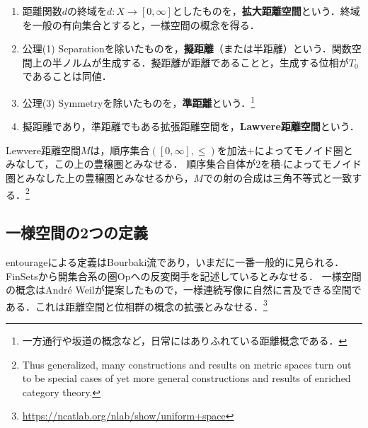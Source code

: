 \documentclass[uplatex,dvipdfmx]{jsreport}
\begin{document}
\begin{definition}\mbox{}
    \begin{enumerate}
        \item 距離関数$d$の終域を$d:X\to[0,\infty]$としたものを，\textbf{拡大距離空間}という．終域を一般の有向集合とすると，一様空間の概念を得る．
        \item 公理(1) Separationを除いたものを，\textbf{擬距離}（または半距離）という．関数空間上の半ノルムが生成する．擬距離が距離であることと，生成する位相が$T_0$であることは同値．
        \item 公理(3) Symmetryを除いたものを，\textbf{準距離}という．\footnote{一方通行や坂道の概念など，日常にはありふれている距離概念である．}
        \item 擬距離であり，準距離でもある拡張距離空間を，\textbf{Lawvere距離空間}という．
    \end{enumerate}
\end{definition}

\begin{lemma}
    Lewvere距離空間$M$は，順序集合$([0,\infty],\le)$を加法$+$によってモノイド圏とみなして，この上の豊穣圏とみなせる．
    順序集合自体が$2$を積$\cdot$によってモノイド圏とみなした上の豊穣圏とみなせるから，$M$での射の合成は三角不等式と一致する．\footnote{Thus generalized, many constructions and results on metric spaces turn out to be special cases of yet more general constructions and results of enriched category theory. }
\end{lemma}

\subsection{一様空間の2つの定義}


\begin{tcolorbox}[colframe=ForestGreen, colback=ForestGreen!10!white,breakable,colbacktitle=ForestGreen!40!white,coltitle=black,fonttitle=\bfseries\sffamily,
    title=一様収束の概念による距離空間の一般化である]
    entourageによる定義はBourbaki流であり，いまだに一番一般的に見られる．FinSetsから開集合系の圏Opへの反変関手を記述しているとみなせる．
    一様空間の概念はAndré Weilが提案したもので，一様連続写像に自然に言及できる空間である．これは距離空間と位相群の概念の拡張とみなせる．\footnote{\url{https://ncatlab.org/nlab/show/uniform+space}}
\end{tcolorbox}
\end{document}

